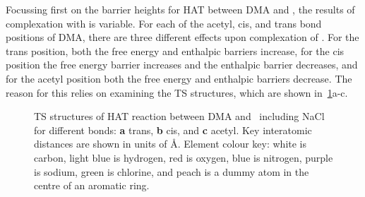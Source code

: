 Focussing first on the barrier heights for HAT between DMA and \cumo, the results of complexation with  is variable. For each of the acetyl, cis, and trans  bond positions of DMA, there are three different effects upon complexation of . For the trans position, both the free energy and enthalpic barriers increase, for the cis position the free energy barrier increases and the enthalpic barrier decreases, and for the acetyl position both the free energy and enthalpic barriers decrease. The reason for this relies on examining the TS structures, which are shown in~\ref{fig:dma-cumo-ts}a-c.

\begin{figure}
  \centering



  \caption[TS structures of HAT reaction between DMA and \cumo\ including NaCl.]{TS structures of HAT reaction between DMA and \cumo\ including NaCl for different  bonds: \textbf{a} trans, \textbf{b} cis, and \textbf{c} acetyl. Key interatomic distances are shown in units of \AA. Element colour key: white is carbon, light blue is hydrogen, red is oxygen, blue is nitrogen, purple is sodium, green is chlorine, and peach is a dummy atom in the centre of an aromatic ring.}
  \label{fig:dma-cumo-ts}
\end{figure}

